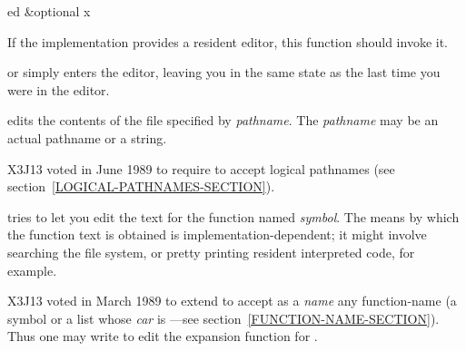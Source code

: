\begin{defun}[Function]
ed &optional x

If the implementation provides a resident editor, this function
should invoke it.

 or  simply enters the editor, leaving you in the same
state as the last time you were in the editor.

 edits the contents of the file specified
by {\it pathname}.  The {\it pathname} may be an actual pathname
or a string.

\begin{newer}
X3J13 voted in June 1989  to require 
to accept logical pathnames (see section~\ref{LOGICAL-PATHNAMES-SECTION}).
\end{newer}

 tries to let you edit the text for the function
named {\it symbol}.  The means by which the function text is obtained
is implementation-dependent; it might involve searching the file system,
or pretty printing resident interpreted code, for example.

\begin{newer}
X3J13 voted in March 1989  to extend 
to accept as a {\it name} any function-name (a symbol or a list
whose {\it car} is ---see section~\ref{FUNCTION-NAME-SECTION}).
Thus one may write  to edit the 
expansion function for .
\end{newer}
\end{defun}


